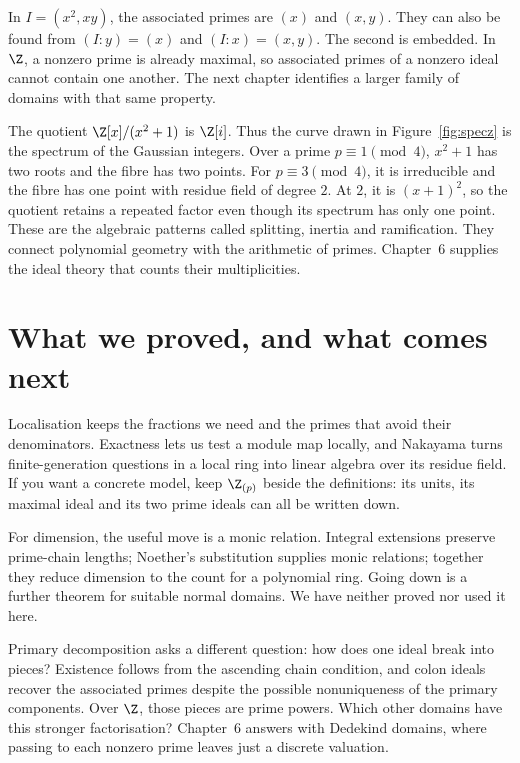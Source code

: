 In $I=(x^2,xy)$, the associated primes are $(x)$ and $(x,y)$. They can also be found from $(I:y)=(x)$ and $(I:x)=(x,y)$. The second is embedded. In $\Z$, a nonzero prime is already maximal, so associated primes of a nonzero ideal cannot contain one another. The next chapter identifies a larger family of domains with that same property.

\begin{beauty}
The quotient $\Z[x]/(x^2+1)$ is $\Z[i]$. Thus the curve drawn in Figure~\ref{fig:specz} is the spectrum of the Gaussian integers. Over a prime $p\equiv1\pmod4$, $x^2+1$ has two roots and the fibre has two points. For $p\equiv3\pmod4$, it is irreducible and the fibre has one point with residue field of degree $2$. At $2$, it is $(x+1)^2$, so the quotient retains a repeated factor even though its spectrum has only one point. These are the algebraic patterns called splitting, inertia and ramification. They connect polynomial geometry with the arithmetic of primes. Chapter~6 supplies the ideal theory that counts their multiplicities.
\end{beauty}

\section{What we proved, and what comes next}

Localisation keeps the fractions we need and the primes that avoid their denominators. Exactness lets us test a module map locally, and Nakayama turns finite-generation questions in a local ring into linear algebra over its residue field. If you want a concrete model, keep $\Z_{(p)}$ beside the definitions: its units, its maximal ideal and its two prime ideals can all be written down.

For dimension, the useful move is a monic relation. Integral extensions preserve prime-chain lengths; Noether's substitution supplies monic relations; together they reduce dimension to the count for a polynomial ring. Going down is a further theorem for suitable normal domains. We have neither proved nor used it here.

Primary decomposition asks a different question: how does one ideal break into pieces? Existence follows from the ascending chain condition, and colon ideals recover the associated primes despite the possible nonuniqueness of the primary components. Over $\Z$, those pieces are prime powers. Which other domains have this stronger factorisation? Chapter~6 answers with Dedekind domains, where passing to each nonzero prime leaves just a discrete valuation.

